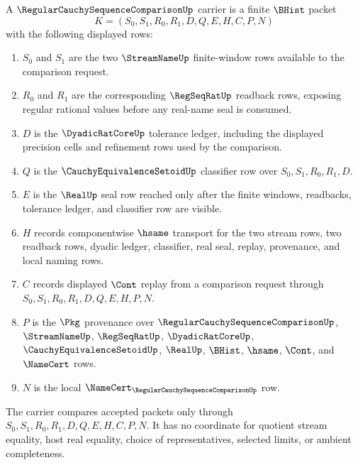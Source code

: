 \begin{definition}
\label{def:regular-cauchy-sequence-comparison-carrier}
A $\RegularCauchySequenceComparisonUp$ carrier is a finite $\BHist$ packet
$$
K=(S_0,S_1,R_0,R_1,D,Q,E,H,C,P,N)
$$
with the following displayed rows:
\begin{enumerate}
\item $S_0$ and $S_1$ are the two $\StreamNameUp$ finite-window rows available to the comparison request.
\item $R_0$ and $R_1$ are the corresponding $\RegSeqRatUp$ readback rows, exposing regular rational values before any real-name seal is consumed.
\item $D$ is the $\DyadicRatCoreUp$ tolerance ledger, including the displayed precision cells and refinement rows used by the comparison.
\item $Q$ is the $\CauchyEquivalenceSetoidUp$ classifier row over $S_0,S_1,R_0,R_1,D$.
\item $E$ is the $\RealUp$ seal row reached only after the finite windows, readbacks, tolerance ledger, and classifier row are visible.
\item $H$ records componentwise $\hsame$ transport for the two stream rows, two readback rows, dyadic ledger, classifier, real seal, replay, provenance, and local naming rows.
\item $C$ records displayed $\Cont$ replay from a comparison request through $S_0,S_1,R_0,R_1,D,Q,E,H,P,N$.
\item $P$ is the $\Pkg$ provenance over $\RegularCauchySequenceComparisonUp$, $\StreamNameUp$, $\RegSeqRatUp$, $\DyadicRatCoreUp$, $\CauchyEquivalenceSetoidUp$, $\RealUp$, $\BHist$, $\hsame$, $\Cont$, and $\NameCert$ rows.
\item $N$ is the local $\NameCert_{\RegularCauchySequenceComparisonUp}$ row.
\end{enumerate}
The carrier compares accepted packets only through $S_0,S_1,R_0,R_1,D,Q,E,H,C,P,N$. It has no coordinate for quotient stream equality, host real equality, choice of representatives, selected limits, or ambient completeness.
\end{definition}

